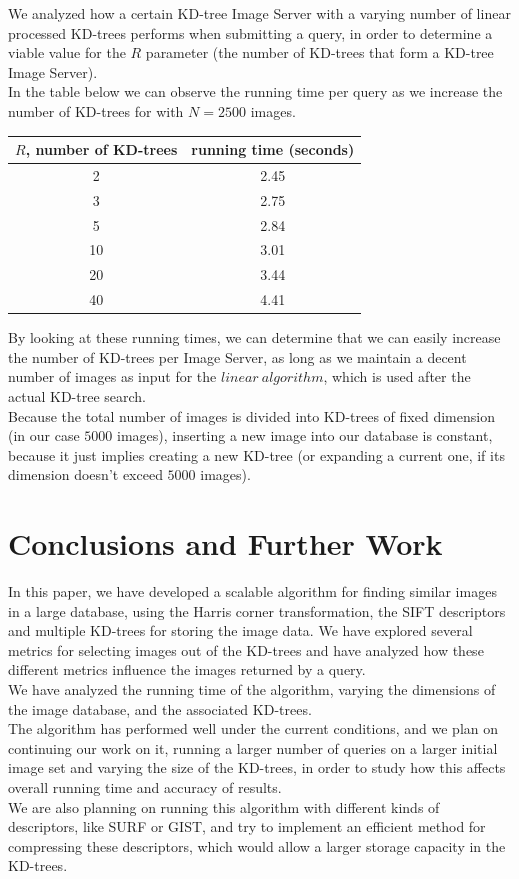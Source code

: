 \documentclass[conference]{IEEEtran}
\begin{document}
We analyzed how a certain KD-tree Image Server with a varying number of linear processed KD-trees performs when submitting a query, in order to determine a viable value for the $R$ parameter (the number of KD-trees that form a KD-tree Image Server).\\
In the table below we can observe the running time per query as we increase the number of KD-trees for with $N=2500$ images.\\

\begin{tabular}{c | c}
  $R$, number of KD-trees & running time (seconds) \\
  \hline
  2 & 2.45 \\
  3 & 2.75 \\
  5 & 2.84 \\
  10 & 3.01 \\
  20 & 3.44 \\
  40 & 4.41 \\
\end{tabular}

By looking at these running times, we can determine that we can easily increase the number of KD-trees per Image Server, as long as we maintain a decent number of images as input for the $linear\ algorithm$, which is used after the actual KD-tree search.\\

Because the total number of images is divided into KD-trees of fixed dimension (in our case $5000$ images), inserting a new image into our database is constant, because it just implies creating a new KD-tree (or expanding a current one, if its dimension doesn't exceed $5000$ images).

\section{Conclusions and Further Work}
In this paper, we have developed a scalable algorithm for finding similar images in a large database, using the Harris corner transformation, the SIFT descriptors and multiple KD-trees for storing the image data. We have explored several metrics for selecting images out of the KD-trees and have analyzed how these different metrics influence the images returned by a query.\\
We have analyzed the running time of the algorithm, varying the dimensions of the image database, and the associated KD-trees.\\
The algorithm has performed well under the current conditions, and we plan on continuing our work on it, running a larger number of queries on a larger initial image set and varying the size of the KD-trees, in order to study how this affects overall running time and accuracy of results.\\
We are also planning on running this algorithm with different kinds of descriptors, like SURF or GIST, and try to implement an efficient method for compressing these descriptors, which would allow a larger storage capacity in the KD-trees.
\end{document}

